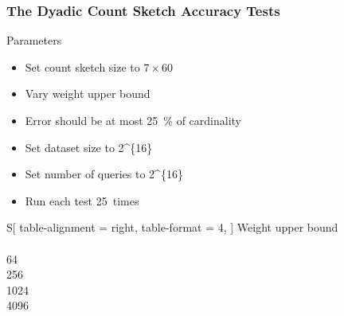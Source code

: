 \documentclass{beamer}
\begin{document}
\begin{frame}
  \frametitle{The Dyadic Count Sketch Accuracy Tests}

  \begin{block}{Parameters}
    \begin{itemize}
      \item Set count sketch size to \( 7 \times 60 \)
      \item Vary weight upper bound
      \item Error should be at most \SI{25}{\percent} of cardinality
      \item Set dataset size to \num[parse-numbers=false]{2^{16}}
      \item Set number of queries to \num[parse-numbers=false]{2^{16}}
      \item Run each test \num{25}~times
    \end{itemize}

    \begin{table}
      \centering
      \begin{tabular}{
        S[
          table-alignment = right,
          table-format = 4,
        ]
      }
        \toprule
        {Weight upper bound} \\
         \\
        64 \\
        256 \\
        1024 \\
        4096 \\
        \bottomrule
      \end{tabular}
    \end{table}
  \end{block}
\end{frame}
\end{document}
